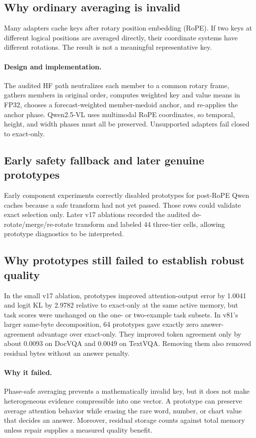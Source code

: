 \documentclass[11pt]{article}
\newcommand{\design}{\paragraph{Design and implementation.}}
\newcommand{\failure}{\paragraph{Why it failed.}}
\begin{document}
\subsection{Why ordinary averaging is invalid}

Many adapters cache keys after rotary position embedding (RoPE).  If two keys at different logical
positions are averaged directly, their coordinate systems have different rotations.  The result
is not a meaningful representative key.

\design
The audited HF path neutralizes each member to a common rotary frame, gathers members in original
order, computes weighted key and value means in FP32, chooses a forecast-weighted member-medoid
anchor, and re-applies the anchor phase.  Qwen2.5-VL uses multimodal RoPE coordinates, so temporal,
height, and width phases must all be preserved.  Unsupported adapters fail closed to exact-only.

\subsection{Early safety fallback and later genuine prototypes}

Early component experiments correctly disabled prototypes for post-RoPE Qwen caches because a safe
transform had not yet passed.  Those rows could validate exact selection only.  Later v17
ablations recorded the audited de-rotate/merge/re-rotate transform and labeled 44 three-tier
cells, allowing prototype diagnostics to be interpreted.

\subsection{Why prototypes still failed to establish robust quality}

In the small v17 ablation, prototypes improved attention-output error by 1.0041 and logit KL by
2.9782 relative to exact-only at the same active memory, but task scores were unchanged on the
one- or two-example task subsets.  In v81's larger same-byte decomposition, 64 prototypes gave
exactly zero answer-agreement advantage over exact-only.  They improved token agreement only by
about 0.0093 on DocVQA and 0.0049 on TextVQA.  Removing them also removed residual bytes without an
answer penalty.

\failure
Phase-safe averaging prevents a mathematically invalid key, but it does not make heterogeneous
evidence compressible into one vector.  A prototype can preserve average attention behavior while
erasing the rare word, number, or chart value that decides an answer.  Moreover, residual storage
counts against total memory unless repair supplies a measured quality benefit.
\end{document}
